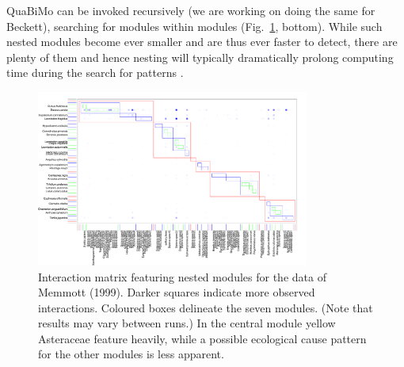 \documentclass[a4paper, 11pt]{article}\usepackage[]{graphicx}\usepackage[]{color}
\begin{document}
QuaBiMo can be invoked recursively (we are working on doing the same for Beckett), searching for modules within modules (Fig.~\ref{fig:memmottmodules}, bottom). While such nested modules become ever smaller and are thus ever faster to detect, there are plenty of them and hence nesting will typically dramatically prolong computing time during the search for patterns \citep{Memmott1999}.
\begin{figure}
	\includegraphics[width=0.8\textwidth]{figures/memmott1999_nested_modules}
	\caption{Interaction matrix featuring nested modules for the data of Memmott (1999). %
	Darker squares indicate more observed interactions. Coloured boxes delineate the seven modules. (Note that results may vary between runs.) In the central module yellow Asteraceae feature heavily, while a possible ecological cause pattern for the other modules is less apparent. %
	}
\label{fig:memmottmodules}
\end{figure}
\end{document}
